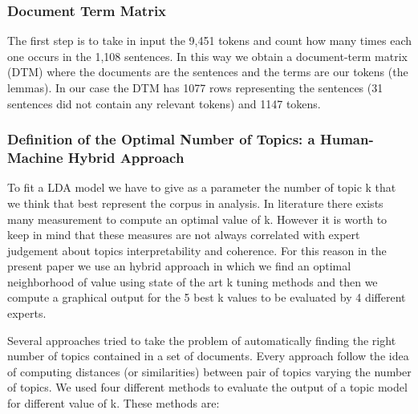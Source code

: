 \documentclass[]{book}
\begin{document}
\subsubsection*{Document Term Matrix}\label{document-term-matrix}

The first step is to take in input the 9,451 tokens and count how many
times each one occurs in the 1,108 sentences. In this way we obtain a
document-term matrix (DTM) where the documents are the sentences and the
terms are our tokens (the lemmas). In our case the DTM has 1077 rows
representing the sentences (31 sentences did not contain any relevant
tokens) and 1147 tokens.

\subsubsection*{Definition of the Optimal Number of Topics: a
Human-Machine Hybrid
Approach}\label{definition-of-the-optimal-number-of-topics-a-human-machine-hybrid-approach}

To fit a LDA model we have to give as a parameter the number of topic k
that we think that best represent the corpus in analysis. In literature
there exists many measurement to compute an optimal value of k. However
it is worth to keep in mind that these measures are not always
correlated with expert judgement about topics interpretability and
coherence. For this reason in the present paper we use an hybrid
approach in which we find an optimal neighborhood of value using state
of the art k tuning methods and then we compute a graphical output for
the 5 best k values to be evaluated by 4 different experts.

Several approaches tried to take the problem of automatically finding
the right number of topics contained in a set of documents. Every
approach follow the idea of computing distances (or similarities)
between pair of topics varying the number of topics. We used four
different methods to evaluate the output of a topic model for different
value of k. These methods are:
\end{document}
